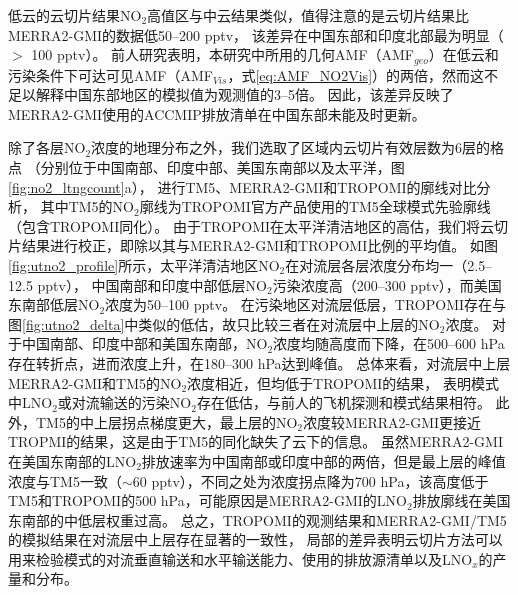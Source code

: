 低云的云切片结果NO$_2$高值区与中云结果类似，值得注意的是云切片结果比MERRA2-GMI的数据低50--200 pptv，
该差异在中国东部和印度北部最为明显（$>$ 100 pptv）。
前人研究表明，本研究中所用的几何AMF（AMF$_{geo}$）在低云和污染条件下可达可见AMF（AMF$_{Vis}$，式\ref{eq:AMF_NO2Vis}）的两倍\citep{BelmonteRivas.2015}，然而这不足以解释中国东部地区的模拟值为观测值的3--5倍。
因此，该差异反映了MERRA2-GMI使用的ACCMIP排放清单在中国东部未能及时更新。

除了各层NO$_2$浓度的地理分布之外，我们选取了区域内云切片有效层数为6层的格点
（分别位于中国南部、印度中部、美国东南部以及太平洋，图\ref{fig:no2_ltngcount}a），
进行TM5、MERRA2-GMI和TROPOMI的廓线对比分析，
其中TM5的NO$_2$廓线为TROPOMI官方产品使用的TM5全球模式先验廓线（包含TROPOMI同化）。
由于TROPOMI在太平洋清洁地区的高估，我们将云切片结果进行校正，即除以其与MERRA2-GMI和TROPOMI比例的平均值。
如图\ref{fig:utno2_profile}所示，太平洋清洁地区NO$_2$在对流层各层浓度分布均一（2.5--12.5 pptv），
中国南部和印度中部低层NO$_2$污染浓度高（200--300 pptv），而美国东南部低层NO$_2$浓度为50--100 pptv。
在污染地区对流层低层，TROPOMI存在与图\ref{fig:utno2_delta}中类似的低估，故只比较三者在对流层中上层的NO$_2$浓度。
对于中国南部、印度中部和美国东南部，NO$_2$浓度均随高度而下降，在500--600 hPa存在转折点，进而浓度上升，在180--300 hPa达到峰值。
总体来看，对流层中上层MERRA2-GMI和TM5的NO$_2$浓度相近，但均低于TROPOMI的结果，
表明模式中LNO$_2$或对流输送的污染NO$_2$存在低估，与前人的飞机探测和模式结果相符\citep{Laughner.2019a,Zhang.2022a}。
此外，TM5的中上层拐点梯度更大，最上层的NO$_2$浓度较MERRA2-GMI更接近TROPMI的结果，这是由于TM5的同化缺失了云下的信息。
虽然MERRA2-GMI在美国东南部的LNO$_2$排放速率为中国南部或印度中部的两倍，但是最上层的峰值浓度与TM5一致（$\sim$60 pptv），不同之处为浓度拐点降为700 hPa，该高度低于TM5和TROPOMI的500 hPa，可能原因是MERRA2-GMI的LNO$_2$排放廓线在美国东南部的中低层权重过高。
总之，TROPOMI的观测结果和MERRA2-GMI/TM5的模拟结果在对流层中上层存在显著的一致性，
局部的差异表明云切片方法可以用来检验模式的对流垂直输送和水平输送能力、使用的排放源清单以及LNO$_x$的产量和分布。



